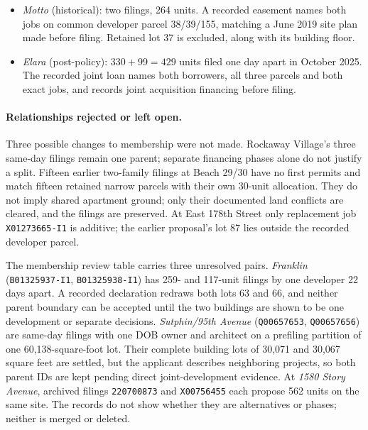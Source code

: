 \begin{itemize}
names both addresses, one owner and the planned merger of six earlier lots,
whose archival areas sum exactly to the official two-building site.
\item \textit{Motto} (historical): two filings, 264 units. A recorded easement
names both jobs on common developer parcel 38/39/155, matching a June 2019
site plan made before filing. Retained lot 37 is excluded, along with its
building floor.
\item \textit{Elara} (post-policy): $330+99=429$ units filed one day apart in
October 2025. The recorded joint loan names both borrowers, all three parcels
and both exact jobs, and records joint acquisition financing before filing.
\end{itemize}

\paragraph{Relationships rejected or left open.}
Three possible changes to membership were not made. Rockaway Village's three same-day
filings remain one parent; separate financing phases alone do not justify a
split. Fifteen earlier two-family filings at Beach 29/30 have no first permits
and match fifteen retained narrow parcels with their own 30-unit allocation.
They do not imply shared apartment ground; only their documented land
conflicts are cleared, and the filings are preserved. At East 178th Street
only replacement job \texttt{X01273665-I1} is additive; the earlier proposal's
lot 87 lies outside the recorded developer parcel.

The membership review table carries three unresolved pairs.
\textit{Franklin} (\texttt{B01325937-I1}, \texttt{B01325938-I1}) has 259- and
117-unit filings by one developer 22 days apart. A recorded declaration
redraws both lots 63 and 66, and neither parent boundary can be accepted until
the two buildings are shown to be one development or separate decisions.
\textit{Sutphin/95th Avenue} (\texttt{Q00657653}, \texttt{Q00657656}) are
same-day filings with one DOB owner and architect on a prefiling partition of
one 60,138-square-foot lot. Their complete building lots of 30,071 and 30,067
square feet are settled, but the applicant describes neighboring projects, so
both parent IDs are kept pending direct joint-development evidence. At
\textit{1580 Story Avenue}, archived filings \texttt{220700873} and
\texttt{X00756455} each propose 562 units on the same site. The records do not
show whether they are alternatives or phases; neither is merged or deleted.

